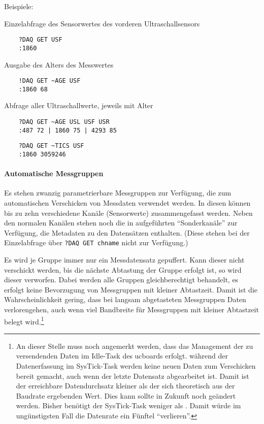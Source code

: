 Beispiele:

Einzelabfrage des Sensorwertes des vorderen Ultraschallsensors
\begin{verbatim}
	?DAQ GET USF
	:1860
\end{verbatim}

Ausgabe des Alters des Messwertes
\begin{verbatim}
	!DAQ GET ~AGE USF
	:1860 68
\end{verbatim}

Abfrage aller Ultraschallwerte, jeweils mit Alter
\begin{verbatim}
	?DAQ GET ~AGE USL USF USR
	:487 72 | 1860 75 | 4293 85
\end{verbatim}



\begin{verbatim}
	?DAQ GET ~TICS USF
	:1860 3059246
\end{verbatim}







\paragraph{Automatische Messgruppen}

Es stehen zwanzig parametrierbare Messgruppen zur Verfügung, die zum automatischen Verschicken von Messdaten verwendet werden. In diesen können bis zu zehn verschiedene Kanäle (Sensorwerte) zusammengefasst werden. Neben den normalen Kanälen stehen noch die in  aufgeführten "`Sonderkanäle"' zur Verfügung, die Metadaten zu den Datensätzen enthalten. (Diese stehen bei der Einzelabfrage über \verb|?DAQ GET chname| nicht zur Verfügung.)

Es wird je Gruppe immer nur ein Messdatensatz gepuffert. Kann dieser nicht verschickt werden, bis die nächste Abtastung der Gruppe erfolgt ist, so wird dieser verworfen. Dabei werden alle Gruppen gleichberechtigt behandelt, \dah es erfolgt keine Bevorzugung von Messgruppen mit kleiner Abtastzeit. Damit ist die Wahrscheinlichkeit gering, dass bei langsam abgetasteten Messgruppen Daten verlorengehen, auch wenn viel Bandbreite für Messgruppen mit kleiner Abtastzeit belegt wird.\footnote{An dieser Stelle muss noch angemerkt werden, dass das Management der zu versendenden Daten im Idle-Task des ucboards erfolgt. \Dah während der Datenerfassung im SysTick-Task werden keine neuen Daten zum Verschicken bereit gemacht, auch wenn der letzte Datensatz abgearbeitet ist. Damit ist der erreichbare Datendurchsatz kleiner als der sich theoretisch aus der Baudrate ergebenden Wert. Dies kann \bzw sollte in Zukunft noch geändert werden. Bisher benötigt der SysTick-Task weniger als . Damit würde im ungünstigsten Fall die Datenrate ein Fünftel "`verlieren"'.}

